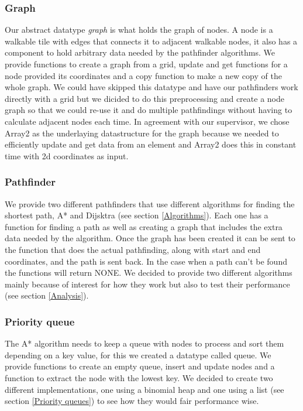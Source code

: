 \documentclass[12pt, a4paper]{article}
\begin{document}
\subsubsection{Graph}
Our abstract datatype \textit{graph} is what holds the graph of nodes. A node is a walkable tile with edges that connects it to adjacent walkable nodes, it also has a component to hold arbitrary data needed by the pathfinder algorithms. We provide functions to create a graph from a grid, update and get functions for a node provided its coordinates and a copy function to make a new copy of the whole graph. We could have skipped this datatype and have our pathfinders work directly with a grid but we dicided to do this preprocessing and create a node graph so that we could re-use it and do multiple pathfindings without having to calculate adjacent nodes each time. In agreement with our supervisor, we chose Array2 as the underlaying datastructure for the graph because we needed to efficiently update and get data from an element and Array2 does this in constant time with 2d coordinates as input.

\subsubsection{Pathfinder}
We provide two different pathfinders that use different algorithms for finding the shortest path, A* and Dijsktra (see section \ref{Algorithms}). Each one has a function for finding a path as well as creating a graph that includes the extra data needed by the algorithm. Once the graph has been created it can be sent to the function that does the actual pathfinding, along with start and end coordinates, and the path is sent back. In the case when a path can't be found the functions will return NONE. We decided to provide two different algorithms mainly because of interest for how they work but also to test their performance (see section \ref{Analysis}).

\subsubsection{Priority queue}
The A* algorithm needs to keep a queue with nodes to process and sort them depending on a key value, for this we created a datatype called queue. We provide functions to create an empty queue, insert and update nodes and a function to extract the node with the lowest key. We decided to create two different implementations, one using a binomial heap and one using a list (see section \ref{Priority queues}) to see how they would fair performance wise.
\end{document}
